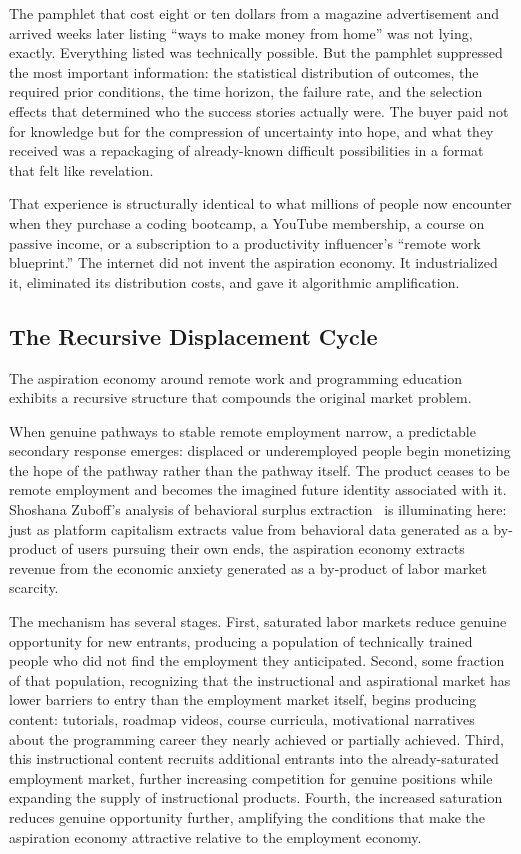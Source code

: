 \documentclass[12pt, a4paper]{article}
\theoremstyle{plain}
\theoremstyle{definition}
\theoremstyle{remark}
\begin{document}
The pamphlet that cost eight or ten dollars from a magazine advertisement
and arrived weeks later listing ``ways to make money from home''
was not lying, exactly.
Everything listed was technically possible.
But the pamphlet suppressed the most important information:
the statistical distribution of outcomes, the required prior conditions,
the time horizon, the failure rate, and the selection effects
that determined who the success stories actually were.
The buyer paid not for knowledge but for the compression of uncertainty
into hope, and what they received was a repackaging of already-known
difficult possibilities in a format that felt like revelation.

That experience is structurally identical to what millions of people
now encounter when they purchase a coding bootcamp, a YouTube membership,
a course on passive income, or a subscription to a productivity influencer's
``remote work blueprint.''
The internet did not invent the aspiration economy.
It industrialized it, eliminated its distribution costs,
and gave it algorithmic amplification.

\subsection{The Recursive Displacement Cycle}

The aspiration economy around remote work and programming education
exhibits a recursive structure that compounds the original market problem.

When genuine pathways to stable remote employment narrow,
a predictable secondary response emerges: displaced or underemployed people
begin monetizing the hope of the pathway rather than the pathway itself.
The product ceases to be remote employment and becomes the imagined future identity
associated with it.
Shoshana Zuboff's analysis of behavioral surplus extraction~\cite{zuboff2019}
is illuminating here: just as platform capitalism extracts value from behavioral data
generated as a by-product of users pursuing their own ends,
the aspiration economy extracts revenue from the economic anxiety
generated as a by-product of labor market scarcity.

The mechanism has several stages.
First, saturated labor markets reduce genuine opportunity for new entrants,
producing a population of technically trained people who did not find
the employment they anticipated.
Second, some fraction of that population, recognizing that the instructional
and aspirational market has lower barriers to entry than the employment market itself,
begins producing content: tutorials, roadmap videos, course curricula,
motivational narratives about the programming career they nearly achieved or partially achieved.
Third, this instructional content recruits additional entrants into
the already-saturated employment market, further increasing competition
for genuine positions while expanding the supply of instructional products.
Fourth, the increased saturation reduces genuine opportunity further,
amplifying the conditions that make the aspiration economy attractive
relative to the employment economy.
\end{document}
